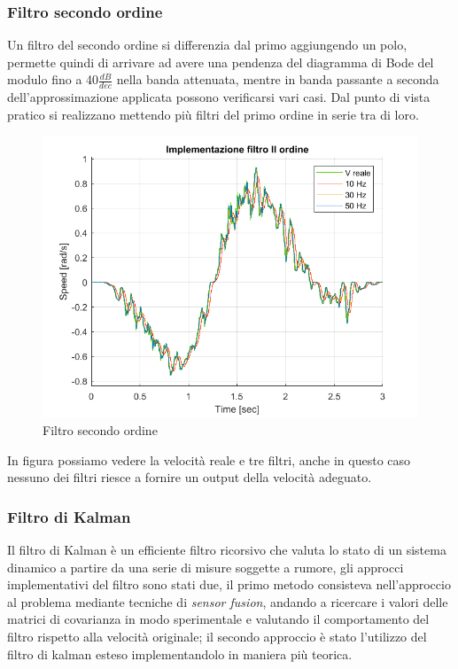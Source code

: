 \subsubsection*{Filtro secondo ordine}
Un filtro del secondo ordine si differenzia dal primo aggiungendo un polo, permette quindi di arrivare ad avere una pendenza del diagramma di Bode del modulo fino a 40$\frac{dB}{dec}$ nella banda attenuata, mentre in banda passante a seconda dell'approssimazione applicata possono verificarsi vari casi. Dal punto di vista pratico si realizzano mettendo più filtri del primo ordine in serie tra di loro. 
\begin{figure}[ht]
	\begin{center}
		\includegraphics[scale=0.6]{Immagini/Traiettorie/FiltroIIOrdine}
		\caption{Filtro secondo ordine}
		\label{fig:filtroIIOrd}
	\end{center}
\end{figure}
In figura possiamo vedere la velocità reale e tre filtri, anche in questo caso nessuno dei filtri riesce a fornire un output della velocità adeguato. 
\subsubsection*{Filtro di Kalman}
Il filtro di Kalman è un efficiente filtro ricorsivo che valuta lo stato di un sistema dinamico a partire da una serie di misure soggette a rumore, gli approcci implementativi del filtro sono stati due, il primo metodo consisteva nell'approccio al problema mediante tecniche di \textit{sensor fusion}, andando a ricercare i valori delle matrici di covarianza in modo sperimentale e valutando il comportamento del filtro rispetto alla velocità originale; il secondo approccio è stato l'utilizzo del filtro di kalman esteso implementandolo in maniera più teorica.

